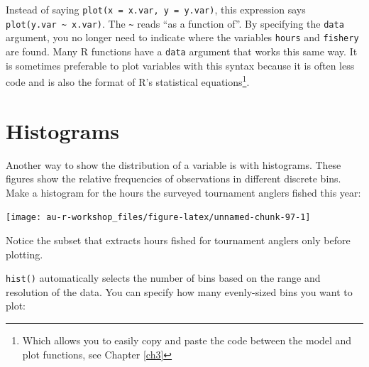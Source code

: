 \documentclass[]{book}
\newenvironment{Shaded}{\begin{snugshade}}{\end{snugshade}}
\newcommand{\CommentTok}[1]{\textcolor[rgb]{0.56,0.35,0.01}{\textit{#1}}}
\newcommand{\DataTypeTok}[1]{\textcolor[rgb]{0.13,0.29,0.53}{#1}}
\newcommand{\DecValTok}[1]{\textcolor[rgb]{0.00,0.00,0.81}{#1}}
\newcommand{\KeywordTok}[1]{\textcolor[rgb]{0.13,0.29,0.53}{\textbf{#1}}}
\newcommand{\NormalTok}[1]{#1}
\newcommand{\OperatorTok}[1]{\textcolor[rgb]{0.81,0.36,0.00}{\textbf{#1}}}
\newcommand{\StringTok}[1]{\textcolor[rgb]{0.31,0.60,0.02}{#1}}
\let\rmarkdownfootnote\footnote%
\def\footnote{\protect\rmarkdownfootnote}
\begin{document}
Instead of saying \texttt{plot(x\ =\ x.var,\ y\ =\ y.var)}, this expression says \texttt{plot(y.var\ \textasciitilde{}\ x.var)}. The \texttt{\textasciitilde{}} reads ``as a function of''. By specifying the \texttt{data} argument, you no longer need to indicate where the variables \texttt{hours} and \texttt{fishery} are found. Many R functions have a \texttt{data} argument that works this same way. It is sometimes preferable to plot variables with this syntax because it is often less code and is also the format of R's statistical equations\footnote{Which allows you to easily copy and paste the code between the model and plot functions, see Chapter \ref{ch3}}.

\hypertarget{histograms}{%
\section{Histograms}\label{histograms}}

Another way to show the distribution of a variable is with histograms. These figures show the relative frequencies of observations in different discrete bins. Make a histogram for the hours the surveyed tournament anglers fished this year:

\begin{Shaded}
\end{Shaded}

\begin{center}\texttt{[image: au-r-workshop\_files/figure-latex/unnamed-chunk-97-1]} \end{center}

Notice the subset that extracts hours fished for tournament anglers only before plotting.

\texttt{hist()} automatically selects the number of bins based on the range and resolution of the data. You can specify how many evenly-sized bins you want to plot:

\begin{Shaded}
\end{Shaded}
\end{document}
